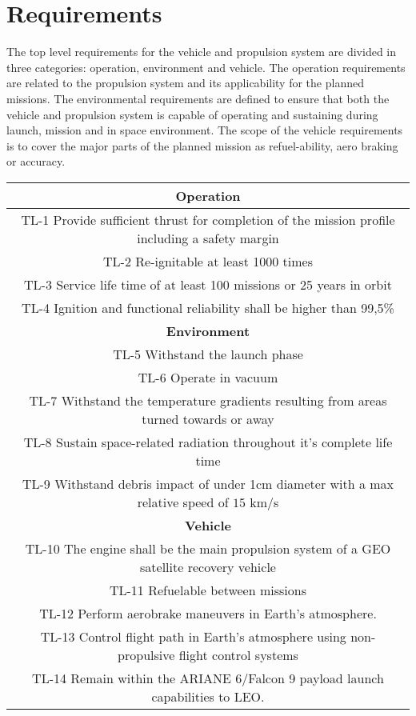 \chapter{Requirements}
\label{chap:2}
\qquad The top level requirements for the vehicle and propulsion system are divided in three categories: operation, environment and vehicle. The operation requirements are related to the propulsion system and its applicability for the planned missions. The environmental requirements are defined to ensure that both the vehicle and propulsion system is capable of operating and sustaining during launch, mission and in space environment. The scope of the vehicle requirements is to cover the major parts of the planned mission as refuel-ability, aero braking or accuracy. \\
\noindent
\begin{table}
\begin{tabular}{|c|}
	\hline
	\cellcolor{blue!60}\textbf{Operation}\\
	\hline
	\cellcolor{blue!15} TL-1 Provide sufficient thrust for completion of the mission profile including a safety margin\\
	\hline
	\cellcolor{blue!15} TL-2 Re-ignitable at least 1000 times\\
	\hline
	\cellcolor{blue!15} TL-3 Service life time of at least 100 missions or 25 years in orbit\\
	\hline
	\cellcolor{blue!15} TL-4 Ignition and functional reliability shall be higher than 99,5\%\\

	\hline
	\cellcolor{blue!60}\textbf{Environment}\\
	\hline
	\cellcolor{blue!15} TL-5 Withstand the launch phase
	\\
	\hline
	\cellcolor{blue!15} TL-6 Operate in vacuum
	\\
	\hline
	\cellcolor{blue!15} TL-7 Withstand the temperature gradients resulting from areas turned towards or away
	\\
	\hline
	\cellcolor{blue!15} TL-8 Sustain space-related radiation throughout it's complete life time
	
	\\
	\hline
	\cellcolor{blue!15} TL-9 Withstand debris impact of under 1cm diameter with a max relative speed of $15$ km/s 	
	\\
	\hline
	\cellcolor{blue!60}\textbf{Vehicle}\\
	\hline
	\cellcolor{blue!15} TL-10 The engine shall be the main propulsion system of a GEO satellite recovery vehicle
	\\
	\hline
	\cellcolor{blue!15} TL-11 Refuelable between missions
	\\
	\hline
	\cellcolor{blue!15} TL-12 Perform aerobrake maneuvers in Earth's atmosphere.
	\\
	\hline
	\cellcolor{blue!15} TL-13 Control \space flight path in  Earth's atmosphere  using non-propulsive flight control systems
	\\
	\cellcolor{blue!15} TL-14 Remain within the ARIANE 6/Falcon 9 payload launch capabilities to LEO.
	

\end{tabular}
\end{table}
